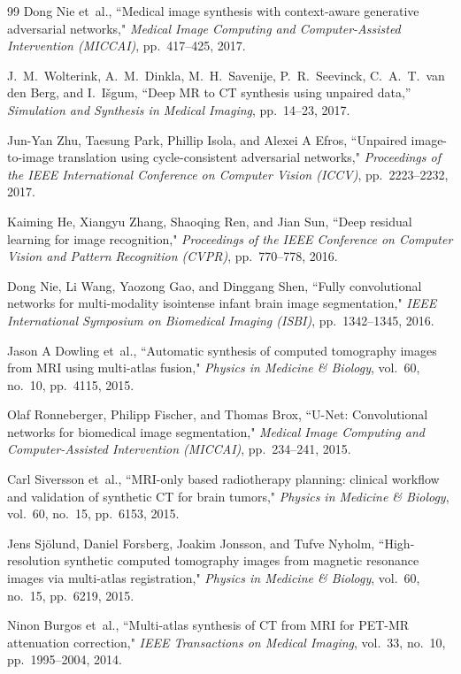 \begin{thebibliography}{99}
Dong Nie et~al., ``Medical image synthesis with context-aware generative adversarial networks," \emph{Medical Image Computing and Computer-Assisted Intervention (MICCAI)}, pp.~417--425, 2017.

J.~M.~Wolterink, A.~M.~Dinkla, M.~H.~Savenije, P.~R.~Seevinck, C.~A.~T.~van den Berg, and I.~I{\v{s}}gum, ``Deep MR to CT synthesis using unpaired data,'' \emph{Simulation and Synthesis in Medical Imaging}, pp.~14--23, 2017.

Jun-Yan Zhu, Taesung Park, Phillip Isola, and Alexei A Efros, ``Unpaired image-to-image translation using cycle-consistent adversarial networks," \emph{Proceedings of the IEEE International Conference on Computer Vision (ICCV)}, pp.~2223--2232, 2017.

Kaiming He, Xiangyu Zhang, Shaoqing Ren, and Jian Sun, ``Deep residual learning for image recognition," \emph{Proceedings of the IEEE Conference on Computer Vision and Pattern Recognition (CVPR)}, pp.~770--778, 2016.

Dong Nie, Li Wang, Yaozong Gao, and Dinggang Shen, ``Fully convolutional networks for multi-modality isointense infant brain image segmentation," \emph{IEEE International Symposium on Biomedical Imaging (ISBI)}, pp.~1342--1345, 2016.

Jason A Dowling et~al., ``Automatic synthesis of computed tomography images from MRI using multi-atlas fusion," \emph{Physics in Medicine \& Biology}, vol.~60, no.~10, pp.~4115, 2015.

Olaf Ronneberger, Philipp Fischer, and Thomas Brox, ``U-Net: Convolutional networks for biomedical image segmentation," \emph{Medical Image Computing and Computer-Assisted Intervention (MICCAI)}, pp.~234--241, 2015.

Carl Siversson et~al., ``MRI-only based radiotherapy planning: clinical workflow and validation of synthetic CT for brain tumors," \emph{Physics in Medicine \& Biology}, vol.~60, no.~15, pp.~6153, 2015.

Jens Sj{\"o}lund, Daniel Forsberg, Joakim Jonsson, and Tufve Nyholm, ``High-resolution synthetic computed tomography images from magnetic resonance images via multi-atlas registration," \emph{Physics in Medicine \& Biology}, vol.~60, no.~15, pp.~6219, 2015.

Ninon Burgos et~al., ``Multi-atlas synthesis of CT from MRI for PET-MR attenuation correction," \emph{IEEE Transactions on Medical Imaging}, vol.~33, no.~10, pp.~1995--2004, 2014.


\end{thebibliography}
